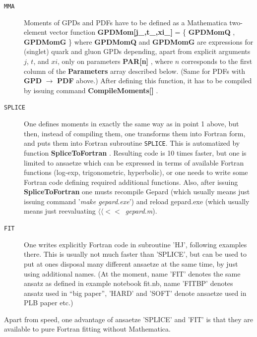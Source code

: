\documentclass[12pt]{article}
\newcommand{\mmacomm}[1]{ {\ttfamily \bfseries #1} }
\begin{document}
\begin{description}
\item[\texttt{MMA}] 
Moments of GPDs and PDFs have to be defined as a Mathematica two-element vector function
\mmacomm{GPDMom[j\_,t\_,xi\_]} = \{\mmacomm{GPDMomQ}, \mmacomm{GPDMomG} \}  where 
\mmacomm{GPDMomQ} and \mmacomm{GPDMomG} are expressions for (singlet) quark and gluon GPDs
depending, apart from explicit arguments $j$, $t$, and $xi$, only on
parameters \mmacomm{PAR[n]}, where $n$ corresponds to the first column of the \mmacomm{Parameters}
array described below. (Same for PDFs with \mmacomm{GPD}$\to$\mmacomm{PDF} above.) 
After defining this function, it has to be compiled by issuing command \mmacomm{CompileMoments[]}.

\item[\texttt{SPLICE}] 
One defines moments in exactly the same way as in point 1 above, but then, instead of compiling
them, one transforms them into Fortran form, and puts them into Fortran subroutine
\texttt{SPLICE}. This is automatized by function \mmacomm{SpliceToFortran}. Resulting code
is 10 times faster, but one is limited to ansaetze which can be expressed in terms of available
Fortran functions (log-exp, trigonometric, hyperbolic), or one needs to write some
Fortran code defining required additional functions. Also, after issuing \mmacomm{SpliceToFortran}
one musts recompile Gepard (which usually means just issuing command '\emph{make gepard.exe}')
and reload gepard.exe (which usually means just reevaluating $\langle\langle<<$~\emph{gepard.m}).

\item[\texttt{FIT}] 
One writes explicitly Fortran code in subroutine 'HJ', following examples there. This
is usually not much faster than 'SPLICE', but can be used to put at ones disposal
many different ansaetze at the same time, by just using additional names.
(At the moment, name 'FIT' denotes the same ansatz as defined in example notebook fit.nb,
name 'FITBP' denotes ansatz used in ``big paper'', 'HARD' and 'SOFT' denote ansaetze used in
PLB paper etc.)
\end{description}

Apart from speed, one advantage of ansaetze 'SPLICE' and 'FIT' is that they are
available to pure Fortran fitting without Mathematica.
\end{document}
